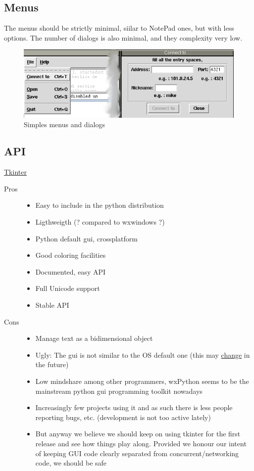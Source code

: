 \documentclass{report}
\begin{document}
\subsection{Menus}

The menus should be strictly minimal, siilar to NotePad ones, but with less options.
The number of dialogs is also minimal, and they complexity very low.

\begin{figure}[htbp]
 \begin{center}
    \includegraphics[angle=0,width=0.5\linewidth]{schemas/simples_menus_and_dialogs.png}
 \end{center}
 \caption{Simples menus and dialogs}
 \label{fig:simplesmenusanddialogs}
\end{figure}


\subsection{API}

\href{http://www.python.org/topics/tkinter/}{Tkinter}

\begin{description}
\item [Pros]
    \begin{itemize}
    \item Easy to include in the python distribution
    \item Ligthweigth (? compared to wxwindows ?)
    \item Python default gui, crossplatform
    \item Good coloring facilities
    \item Documented, easy API
    \item Full Unicode support
    \item Stable API
    \end{itemize}

\item [Cons]
    \begin{itemize}
    \item Manage text as a bidimensional object
    \item Ugly: The gui is not similar to the OS default one (this may \href{http://tcl.projectforum.com/tk/47}{change} in the future)
    \item Low mindshare among other programmers, wxPython seems to be the mainstream python gui programming toolkit nowadays
    \item Increasingly few projects using it and as such there is less people reporting bugs, etc. (development is not too active lately)
    \item But anyway we believe we should keep on using tkinter for the first release and see how things play along. Provided we honour our intent of keeping GUI code clearly separated from concurrent/networking code, we should be safe
    \end{itemize}
\end{description}
\end{document}
